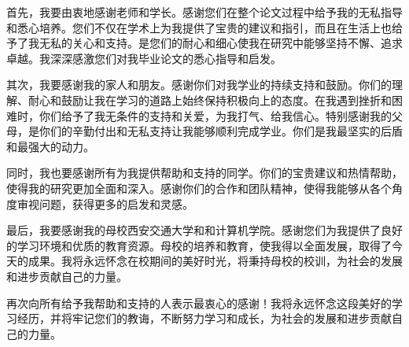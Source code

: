 

 首先，我要由衷地感谢老师和学长。感谢您们在整个论文过程中给予我的无私指导和悉心培养。您们不仅在学术上为我提供了宝贵的建议和指引，而且在生活上也给予了我无私的关心和支持。是您们的耐心和细心使我在研究中能够坚持不懈、追求卓越。我深深感激您们对我毕业论文的悉心指导和启发。

其次，我要感谢我的家人和朋友。感谢你们对我学业的持续支持和鼓励。你们的理解、耐心和鼓励让我在学习的道路上始终保持积极向上的态度。在我遇到挫折和困难时，你们给予了我无条件的支持和关爱，为我打气、给我信心。特别感谢我的父母，是你们的辛勤付出和无私支持让我能够顺利完成学业。你们是我最坚实的后盾和最强大的动力。

同时，我也要感谢所有为我提供帮助和支持的同学。你们的宝贵建议和热情帮助，使得我的研究更加全面和深入。感谢你们的合作和团队精神，使得我能够从各个角度审视问题，获得更多的启发和灵感。

最后，我要感谢我的母校西安交通大学和和计算机学院。感谢您们为我提供了良好的学习环境和优质的教育资源。母校的培养和教育，使我得以全面发展，取得了今天的成果。我将永远怀念在校期间的美好时光，将秉持母校的校训，为社会的发展和进步贡献自己的力量。

再次向所有给予我帮助和支持的人表示最衷心的感谢！我将永远怀念这段美好的学习经历，并将牢记您们的教诲，不断努力学习和成长，为社会的发展和进步贡献自己的力量。
